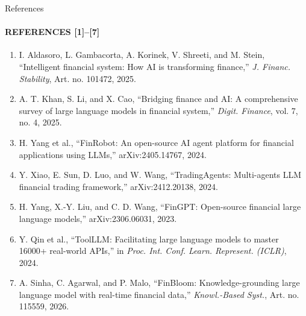 \documentclass[aspectratio=169,11pt]{beamer}
\begin{document}
\begin{frame}{References}
  \framesubtitle{REFERENCES [1]--[7]}
  \fontsize{8}{9.2}\selectfont
  \begin{enumerate}\setlength{\itemsep}{3pt}
    \item I. Aldasoro, L. Gambacorta, A. Korinek, V. Shreeti, and M. Stein, ``Intelligent financial system: How AI is transforming finance,'' \emph{J. Financ. Stability}, Art. no. 101472, 2025.
    \item A. T. Khan, S. Li, and X. Cao, ``Bridging finance and AI: A comprehensive survey of large language models in financial system,'' \emph{Digit. Finance}, vol. 7, no. 4, 2025.
    \item H. Yang et al., ``FinRobot: An open-source AI agent platform for financial applications using LLMs,'' arXiv:2405.14767, 2024.
    \item Y. Xiao, E. Sun, D. Luo, and W. Wang, ``TradingAgents: Multi-agents LLM financial trading framework,'' arXiv:2412.20138, 2024.
    \item H. Yang, X.-Y. Liu, and C. D. Wang, ``FinGPT: Open-source financial large language models,'' arXiv:2306.06031, 2023.
    \item Y. Qin et al., ``ToolLLM: Facilitating large language models to master 16000+ real-world APIs,'' in \emph{Proc. Int. Conf. Learn. Represent. (ICLR)}, 2024.
    \item A. Sinha, C. Agarwal, and P. Malo, ``FinBloom: Knowledge-grounding large language model with real-time financial data,'' \emph{Knowl.-Based Syst.}, Art. no. 115559, 2026.
  \end{enumerate}
\end{frame}
\end{document}
